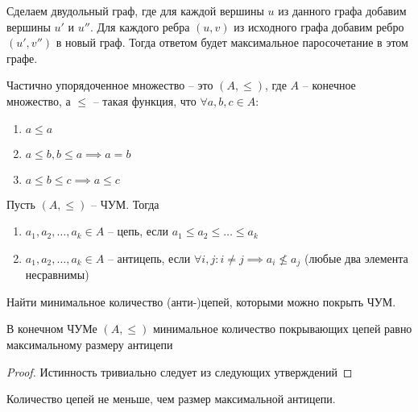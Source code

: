 \begin{solution}
    Сделаем двудольный граф, где для каждой вершины $u$ из данного графа добавим вершины $u'$ и $u''$. Для каждого ребра $(u, v)$ из исходного графа добавим ребро $(u', v'')$ в новый граф. Тогда ответом будет максимальное паросочетание в этом графе.
\end{solution} %

\begin{definition}
    Частично упорядоченное множество -- это $(A, \leq)$, где $A$ -- конечное множество, а $\leq$ -- такая функция, что $\forall a, b, c \in A$:
    \begin{enumerate}
        \item $a \leq a$
        \item $a \leq b, b \leq a \implies a = b$
        \item $a \leq b \leq c \implies a \leq c$
    \end{enumerate}
\end{definition}

\begin{definition}
    Пусть $(A, \leq)$ -- ЧУМ. Тогда 
    \begin{enumerate}
        \item $a_1, a_2, \ldots, a_k \in A$ -- цепь, если $a_1 \leq a_2 \leq \ldots \leq a_k$
        \item $a_1, a_2, \ldots, a_k \in A$ -- антицепь, если $\forall i, j: i \neq j \implies a_i \nleqslant a_j$ (любые два элемента несравнимы)
    \end{enumerate}
\end{definition}

\begin{problem}
    Найти минимальное количество (анти-)цепей, которыми можно покрыть ЧУМ.
\end{problem}

\begin{theorem}
    В конечном ЧУМе $(A, \leq)$ минимальное количество покрывающих цепей равно максимальному размеру антицепи
\end{theorem}

\begin{proof}
    Истинность тривиально следует из следующих утверждений
\end{proof}

\begin{proposition}
    Количество цепей не меньше, чем размер максимальной антицепи.
\end{proposition}

